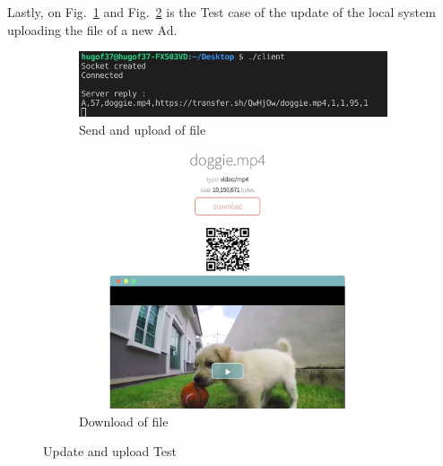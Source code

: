 Lastly, on Fig.~\ref{fig:rs-upload-test} and Fig.~\ref{fig:rs-download-test} is the Test case of the update of the local system uploading the file of a new Ad.
%
\begin{figure}[htb!]
  \centering
  \begin{subfigure}{.7\textwidth}
    \includegraphics[width=\textwidth]{img/rs-upload-test.jpg}%
  \caption{Send and upload of file}%
  \label{fig:rs-upload-test}
  \end{subfigure}
  \begin{subfigure}{.6\textwidth}
    \includegraphics[width=\textwidth]{img/rs-download-test.jpg}%
  \caption{Download of file}%
  \label{fig:rs-download-test}
  \end{subfigure}
  \caption{Update and upload Test}%
  \label{fig:rs-update-upload-test}
\end{figure}